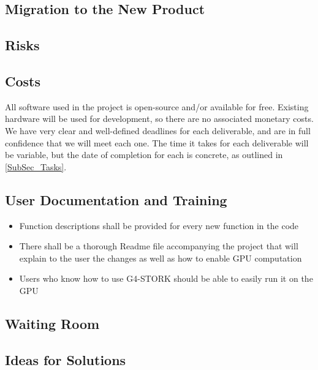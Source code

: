 \documentclass[12pt]{article}
\begin{document}
\subsection{Migration to the New Product} %

\subsection{Risks} %

\subsection{Costs} %
All software used in the project is open-source and/or available for free. Existing hardware will be used for development, so there are no associated monetary costs.\\

We have very clear and well-defined deadlines for each deliverable, and are in full confidence that we will meet each one. The time it takes for each deliverable will be variable, but the date of completion for each is concrete, as outlined in \ref{SubSec_Tasks}.

\subsection{User Documentation and Training} %
\begin{itemize}
	\item Function descriptions shall be provided for every new function in the code
	\item There shall be a thorough Readme file accompanying the project that will explain to the user the changes as well as how to enable GPU computation
	\item Users who know how to use G4-STORK should be able to easily run it on the GPU
\end{itemize}

\subsection{Waiting Room} %

\subsection{Ideas for Solutions} %
\end{document}
